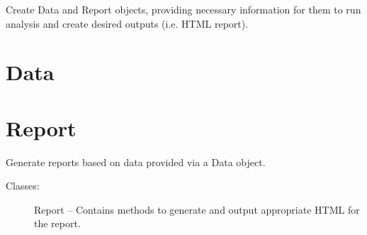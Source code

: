 \documentclass[letterpaper,10pt,english]{sphinxmanual}
\begin{document}
\begin{fulllineitems}
\label{Code_rst/app:application.main}
Create Data and Report objects, providing necessary information for them 
to run analysis and create desired outputs (i.e. HTML report).

\end{fulllineitems}



\section{Data}
\label{Code_rst/dat:data}\label{Code_rst/dat::doc}

\section{Report}
\label{Code_rst/rep:report}\label{Code_rst/rep::doc}\label{Code_rst/rep:module-report}
Generate reports based on data provided via a Data object.
\begin{description}
\item[{Classes:}] \leavevmode
Report -- Contains methods to generate and output appropriate HTML for the report.

\end{description}
\end{document}
